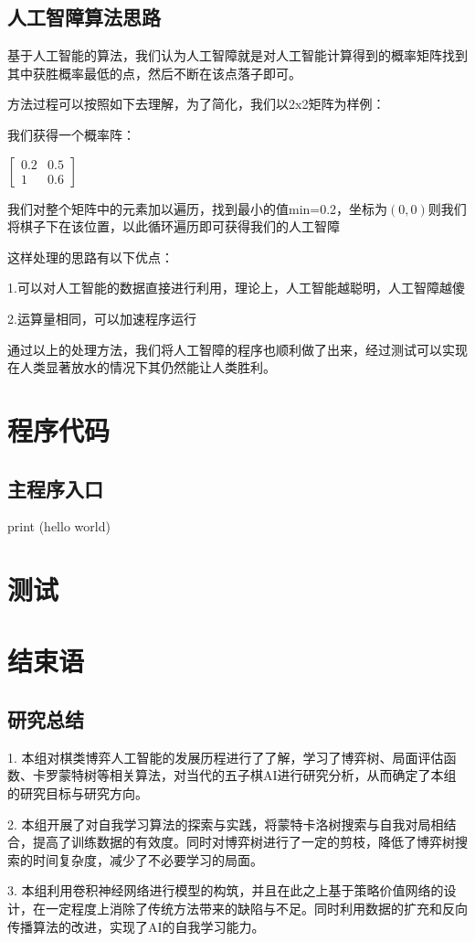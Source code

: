 \documentclass[a4paper]{article}
\begin{document}
\begin{multicols}{2}
\subsection{人工智障算法思路}
基于人工智能的算法，我们认为人工智障就是对人工智能计算得到的概率矩阵找到其中获胜概率最低的点，然后不断在该点落子即可。\par
方法过程可以按照如下去理解，为了简化，我们以2x2矩阵为样例：\par
我们获得一个概率阵：\par
$\begin{bmatrix} 0.2 & 0.5 \\ 1 & 0.6 \end{bmatrix}$\par
我们对整个矩阵中的元素加以遍历，找到最小的值min=0.2，坐标为$(0,0)$则我们将棋子下在该位置，以此循环遍历即可获得我们的人工智障\par
这样处理的思路有以下优点：\par
1.可以对人工智能的数据直接进行利用，理论上，人工智能越聪明，人工智障越傻\par
2.运算量相同，可以加速程序运行\par
通过以上的处理方法，我们将人工智障的程序也顺利做了出来，经过测试可以实现在人类显著放水的情况下其仍然能让人类胜利。
    \section{程序代码}
    \subsection{主程序入口}
    \begin{python}
        print (hello world)
    \end{python}
    \section{测试}

    \section{结束语}
    \subsection{研究总结}
    1.	本组对棋类博弈人工智能的发展历程进行了了解，学习了博弈树、局面评估函数、卡罗蒙特树等相关算法，对当代的五子棋AI进行研究分析，从而确定了本组的研究目标与研究方向。\par
2.	本组开展了对自我学习算法的探索与实践，将蒙特卡洛树搜索与自我对局相结合，提高了训练数据的有效度。同时对博弈树进行了一定的剪枝，降低了博弈树搜索的时间复杂度，减少了不必要学习的局面。\par
3.	本组利用卷积神经网络进行模型的构筑，并且在此之上基于策略价值网络的设计，在一定程度上消除了传统方法带来的缺陷与不足。同时利用数据的扩充和反向传播算法的改进，实现了AI的自我学习能力。\par

\end{multicols}
\end{document}
